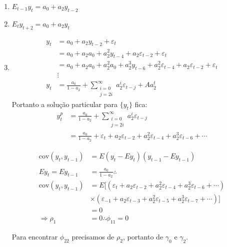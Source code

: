 \begin{enumerate}
\begin{enumerate}
\begin{enumerate}
			\item
			
			$E_{t-1}y_t=a_0+a_2y_{t-2}$
			
			\item
			$E_ty_{t+2}=a_0+a_2y_t$
			
			\item
			
		\begin{align*}
			y_t&=a_0+a_2y_{t-2}+\varepsilon_{t}\\
			&=a_0+a_2a_0+a_2^2y_{t-4}+a_2\varepsilon_{t-2}+\varepsilon_{t}\\
			&=a_0+a_2a_0+a_2^2a_0+a_2^3y_{t-6}+a_2^2\varepsilon_{t-4}+a_2\varepsilon_{t-2}+\varepsilon_{t}\\
			&\vdots\\
			y_t&=\frac{a_0}{1-a_2}+\sum \limits_{\substack{i=0\\
					j=2i}}^{\infty}a_2^i\varepsilon_{t-j}+Aa_2^t
		\end{align*}
	Portanto a solução particular para $\{y_t\}$ fica: 
	\begin{align*}
		y_t^p&=\frac{a_0}{1-a_2}+\sum \limits_{\substack{i=0\\
				j=2i}}^{\infty}a_2^i\varepsilon_{t-j}\\
			&=\frac{a_0}{1-a_2}+\varepsilon_t+a_2\varepsilon_{t-2}+a_2^2\varepsilon_{t-4}+a_2^3\varepsilon_{t-6}+\cdots
		\end{align*}
	
	\begin{align*}
		\text{cov}(y_t,y_{t-1})&=E(y_t-Ey_t)(y_{t-1}-Ey_{t-1})\\
		\\
		Ey_t=Ey_{t-1}&=\frac{a_0}{1-a_2}\therefore\\
			\text{cov}(y_t,y_{t-1})&=E[(\varepsilon_t+a_2\varepsilon_{t-2}+a_2^2\varepsilon_{t-4}+a_2^3\varepsilon_{t-6}+\cdots)\\
			\;\;&\times(\varepsilon_{-1}+a_2\varepsilon_{t-3}+a_2^2\varepsilon_{t-5}+a_2^3\varepsilon_{t-7}+\cdots)]\\
			&=0\\
			\Rightarrow \rho_1&=0 \therefore \phi_{11}=0
	\end{align*}

	Para encontrar $\phi_{22}$ precisamos de $\rho_2$, portanto de $\gamma_0$ e $\gamma_2$.
	

\end{enumerate}
\end{enumerate}
\end{enumerate}
